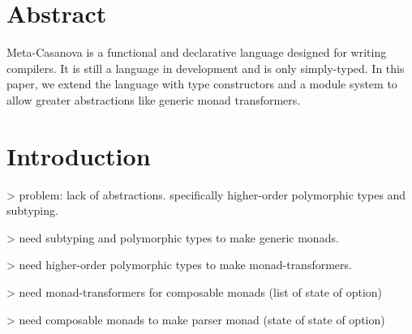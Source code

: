 \section*{Abstract}
Meta-Casanova is a functional and declarative language designed for writing compilers. 
It is still a language in development and is only simply-typed.
In this paper, we extend the language with type constructors and a module system to allow greater abstractions like generic monad transformers.

\section*{Introduction}
\begin{multicols}{2}
  > problem: lack of abstractions. specifically higher-order polymorphic types and subtyping.

  > need subtyping and polymorphic types to make generic monads.

  > need higher-order polymorphic types to make monad-transformers.

  > need monad-transformers for composable monads (list of state of option)

  > need composable monads to make parser monad (state of state of option)
  
\end{multicols}
